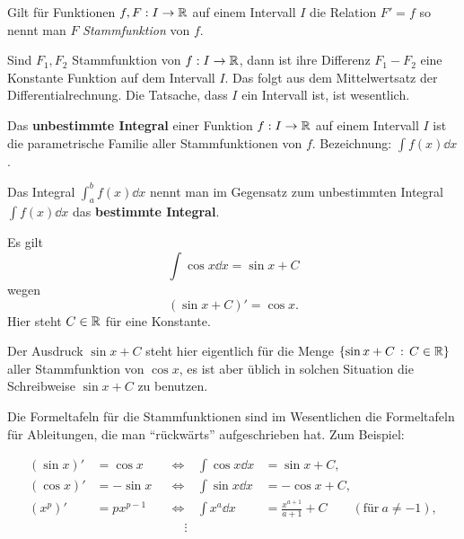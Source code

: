 \begin{defn}
	Gilt für Funktionen $f, F: I \to \mathbb{R}$ auf einem Intervall $I$ die Relation $F' = f$ so nennt man $F$ \emph{Stammfunktion} von $f$. 
\end{defn} 

\begin{bem} 
	Sind $F_1, F_2$ Stammfunktion von $ f: I \to \mathbb{R}$, dann ist ihre Differenz $F_1 - F_2$ eine Konstante Funktion auf dem Intervall $I$. Das folgt aus dem Mittelwertsatz der Differentialrechnung. Die Tatsache, dass $I$ ein Intervall ist, ist wesentlich. 
\end{bem} 

\begin{defn} 
	Das \textbf{unbestimmte Integral} einer Funktion $ f: I \to \mathbb{R}$ auf einem Intervall $I$ ist die parametrische Familie aller Stammfunktionen von $f$. Bezeichnung: $\int f(x) \dd x$. 
\end{defn} 

\begin{bem}
	Das Integral $\int_a^b f(x) \dd x$ nennt man im Gegensatz zum unbestimmten Integral $\int f(x) \dd x$ das \textbf{bestimmte Integral}. 
\end{bem} 

\begin{bsp}
		Es gilt
		\[\int \cos x \dd x= \sin x + C\] 
		wegen 
		\[
			(\sin x + C)' = \cos x.
		\]
		Hier steht $C \in \mathbb{R}$ für eine Konstante. 
		
		Der Ausdruck $\sin x+ C$ steht hier eigentlich für die Menge $\left\{  \sin x+ C \,:\, C \in \mathbb{R} \right\}$ aller Stammfunktion von $\cos  x$, es ist aber üblich in solchen Situation die Schreibweise $\sin x+ C$ zu benutzen. 
\end{bsp} 

\begin{bem}
	Die Formeltafeln für die Stammfunktionen sind im Wesentlichen die Formeltafeln für Ableitungen, die man ``rückwärts'' aufgeschrieben hat. Zum Beispiel: 
	
	\begin{align*}
		(\sin x)'  & = \cos x  & & \Longleftrightarrow & \int \cos x \dd x & = \sin x + C,
	\\	(\cos x)'  & = - \sin x  & & \Longleftrightarrow & \int \sin x \dd x & = - \cos x + C,		
	\\ (x^p)' & = p x^{p-1} & & \Longleftrightarrow & \int x^a \dd x & = \frac{x^{a+1}}{a+1} + C \qquad (\text{für} \ a \ne -1),
\\	& & & \quad\vdots 
	\end{align*} 
\end{bem} 

